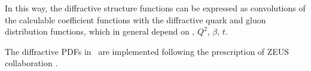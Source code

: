 In this way, the diffractive structure functions can be expressed as convolutions of the
calculable coefficient functions with the diffractive quark and gluon distribution functions,
 which in general depend on \xpom, $Q^2$, $\beta$, $t$.

The diffractive PDFs in \fitter\ are implemented following the prescription of ZEUS
collaboration \cite{zeus:diff2009}.
%





